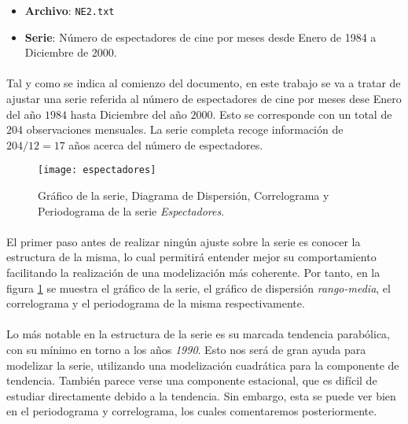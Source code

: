 \documentclass[a4paper, spanish]{article}
\begin{document}
  \maketitle

  \begin{itemize}
    \item \textbf{Archivo}: \texttt{NE2.txt}
    \item \textbf{Serie}: Número de espectadores de cine por meses desde Enero de 1984 a Diciembre de 2000.
  \end{itemize}

    \paragraph{}
    Tal y como se indica al comienzo del documento, en este trabajo se va a tratar de ajustar una serie referida al número de espectadores de cine por meses dese Enero del año $1984$ hasta Diciembre del año $2000$. Esto se corresponde con un total de $204$ observaciones mensuales. La serie completa recoge información de $204 / 12 = 17$ años acerca del número de espectadores.

    \begin{figure}[h]
      \texttt{[image: espectadores]}
      \caption{Gráfico de la serie, Diagrama de Dispersión, Correlograma y Periodograma de la serie \emph{Espectadores}.}
      \label{fig:espectadores}
    \end{figure}

    \paragraph{}
    El primer paso antes de realizar ningún ajuste sobre la serie es conocer la estructura de la misma, lo cual permitirá entender mejor su comportamiento facilitando la realización de una modelización más coherente. Por tanto, en la figura \ref{fig:espectadores} se muestra el gráfico de la serie, el gráfico de dispersión \emph{rango-media}, el correlograma y el periodograma de la misma respectivamente.

    \paragraph{}
    Lo más notable en la estructura de la serie es su marcada tendencia parabólica, con su mínimo en torno a los años \emph{1990}. Esto nos será de gran ayuda para modelizar la serie, utilizando una modelización cuadrática para la componente de tendencia. También parece verse una componente estacional, que es difícil de estudiar directamente debido a la tendencia. Sin embargo, esta se puede ver bien en el periodograma y correlograma, los cuales comentaremos posteriormente.
\end{document}
